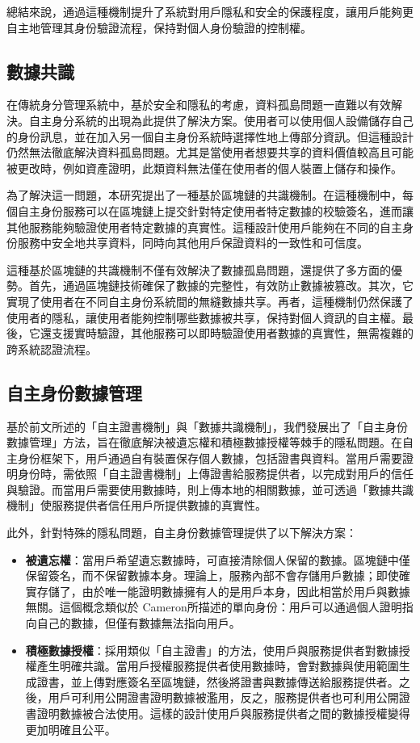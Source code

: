 總結來說，通過這種機制提升了系統對用戶隱私和安全的保護程度，讓用戶能夠更自主地管理其身份驗證流程，保持對個人身份驗證的控制權。
\subsection{數據共識}
在傳統身分管理系統中，基於安全和隱私的考慮，資料孤島問題一直難以有效解決。自主身分系統的出現為此提供了解決方案。使用者可以使用個人設備儲存自己的身份訊息，並在加入另一個自主身份系統時選擇性地上傳部分資訊。但這種設計仍然無法徹底解決資料孤島問題。尤其是當使用者想要共享的資料價值較高且可能被更改時，例如資產證明，此類資料無法僅在使用者的個人裝置上儲存和操作。

為了解決這一問題，本研究提出了一種基於區塊鏈的共識機制。在這種機制中，每個自主身份服務可以在區塊鏈上提交針對特定使用者特定數據的校驗簽名，進而讓其他服務能夠驗證使用者特定數據的真實性。這種設計使用戶能夠在不同的自主身份服務中安全地共享資料，同時向其他用戶保證資料的一致性和可信度。

這種基於區塊鏈的共識機制不僅有效解決了數據孤島問題，還提供了多方面的優勢。首先，通過區塊鏈技術確保了數據的完整性，有效防止數據被篡改。其次，它實現了使用者在不同自主身份系統間的無縫數據共享。再者，這種機制仍然保護了使用者的隱私，讓使用者能夠控制哪些數據被共享，保持對個人資訊的自主權。最後，它還支援實時驗證，其他服務可以即時驗證使用者數據的真實性，無需複雜的跨系統認證流程。
\subsection{自主身份數據管理}
基於前文所述的「自主證書機制」與「數據共識機制」，我們發展出了「自主身份數據管理」方法，旨在徹底解決被遺忘權和積極數據授權等棘手的隱私問題。在自主身份框架下，用戶通過自有裝置保存個人數據，包括證書與資料。當用戶需要證明身份時，需依照「自主證書機制」上傳證書給服務提供者，以完成對用戶的信任與驗證。而當用戶需要使用數據時，則上傳本地的相關數據，並可透過「數據共識機制」使服務提供者信任用戶所提供數據的真實性。

此外，針對特殊的隱私問題，自主身份數據管理提供了以下解決方案：
\begin{itemize}
  \item \textbf{被遺忘權}：當用戶希望遺忘數據時，可直接清除個人保留的數據。區塊鏈中僅保留簽名，而不保留數據本身。理論上，服務內部不會存儲用戶數據；即使確實存儲了，由於唯一能證明數據擁有人的是用戶本身，因此相當於用戶與數據無關。這個概念類似於 Cameron\cite{cameron2005laws}所描述的單向身份：用戶可以通過個人證明指向自己的數據，但僅有數據無法指向用戶。
  \item \textbf{積極數據授權}：採用類似「自主證書」的方法，使用戶與服務提供者對數據授權產生明確共識。當用戶授權服務提供者使用數據時，會對數據與使用範圍生成證書，並上傳對應簽名至區塊鏈，然後將證書與數據傳送給服務提供者。之後，用戶可利用公開證書證明數據被濫用，反之，服務提供者也可利用公開證書證明數據被合法使用。這樣的設計使用戶與服務提供者之間的數據授權變得更加明確且公平。
\end{itemize}

